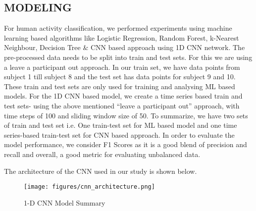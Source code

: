 \documentclass[acmtog]{acmart}
\begin{document}
\subsection{MODELING}
For human activity classification, we performed experiments using machine learning based algorithms like Logistic Regression, Random Forest, k-Nearest Neighbour, Decision Tree \& CNN based approach using 1D CNN network. The pre-processed data needs to be split into train and test sets. For this we are using a leave a participant out approach. In our train set, we have data points from subject 1 till subject 8 and the test set has data points for subject 9 and 10. These train and test sets are only used for training and analysing ML based models. For the 1D CNN based model, we create a time series based train and test sets- using the above mentioned “leave a participant out” approach, with time steps of 100 and sliding window size of 50.
To summarize, we have two sets of train and test set i.e. One train-test set for ML based model and one time series-based train-test set for CNN based approach. In order to evaluate the model performance, we consider F1 Scores as it is a good blend of precision and recall and overall, a good metric for evaluating unbalanced data. 

The architecture of the CNN used in our study is shown below.
\begin{figure}[H]
    \centering
    \texttt{[image: figures/cnn\_architecture.png]}
    \caption{1-D CNN Model Summary}
    \label{fig:cnn_architecture}
 \end{figure}
\end{document}

